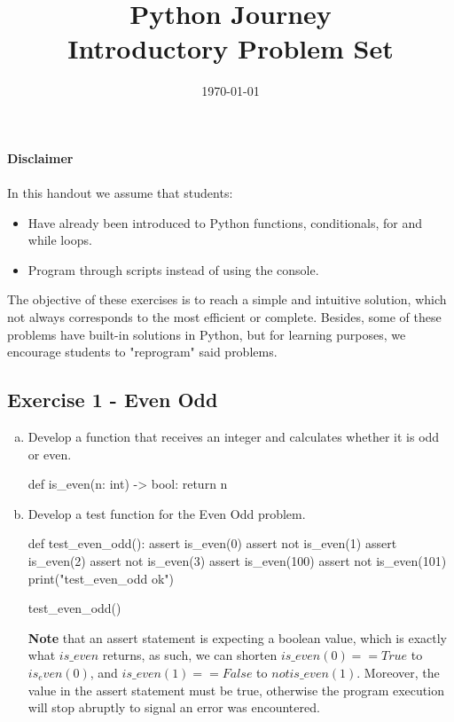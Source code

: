 \documentclass[12pt]{article}
\title{\textbf{Python Journey} \\ \large Introductory Problem Set}
\date{\today}
\begin{document}
\maketitle

\noindent \textbf{Disclaimer} \\\\
In this handout we assume that students:
\begin{itemize}
    \item Have already been introduced to Python functions, conditionals, 
      for and while loops.
    \item Program through scripts instead of using the console.
\end{itemize}

\noindent The objective of these exercises is to reach a simple and intuitive 
solution, which not always corresponds to the most efficient or complete. 
Besides, some of these problems have built-in solutions in Python, but for 
learning purposes, we encourage students to "reprogram" said problems.

\subsection*{Exercise 1 - Even Odd} 
\begin{enumerate}[a)]
  \item Develop a function that receives an integer and calculates whether it 
    is odd or even.
    \begin{pythonlst}
def is_even(n: int) -> bool:
  return n %
    \end{pythonlst}
  \vspace{-6mm}
  \item Develop a test function for the Even Odd problem.
    \begin{pythonlst}
def test_even_odd():
  assert is_even(0)
  assert not is_even(1)
  assert is_even(2)
  assert not is_even(3)
  assert is_even(100)
  assert not is_even(101)
  print("test_even_odd ok")

test_even_odd()
    \end{pythonlst}
    \vspace{-6mm}
    \textbf{Note} that an assert statement is expecting a boolean value, which 
    is exactly what $is\_even$ returns, as such, we can shorten 
    $is\_even(0) == True$ to $is_even(0)$, and $is\_even(1) == False$ to 
    $not is\_even(1)$. Moreover, the value in the assert statement must be true,
    otherwise the program execution will stop abruptly to signal an error was
    encountered. 
\end{enumerate}
\end{document}
